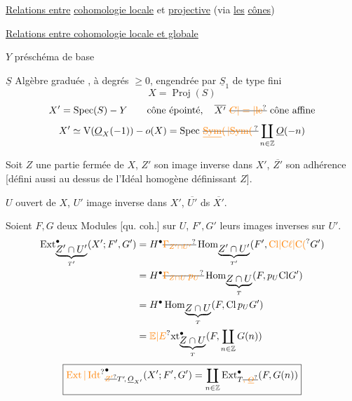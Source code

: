 \uline{Relations entre} \uline{cohomologie locale} et \uline{projective} (via \uline{les} \uline{cônes})

\uline{Relations entre cohomologie locale et globale}

$Y$ préschéma de base

$\underline S$ Algèbre graduée , à degrés $\geq 0$, engendrée par $\underline S_1$ de type fini
\[
 X=\operatorname{Proj}(S)
\]
\[
 X'=\operatorname{Spec}(S)-Y \qquad \text{cône épointé},\quad
 \overline{X'}\ \deleted{\unsure{C|=|\text{le}}}\ \text{cône affine}
\]
\[
 X'\simeq\mathrm V(\underline O_X(-1))-o(X)
 =\operatorname{Spec}\,\deleted{\unsure{\underline{\operatorname{Sym}}(\,|{\operatorname{Sym}}(\,}}%
 \coprod_{n\in\mathbb Z}\underline O(-n)
\]

Soit $Z$ une partie fermée de $X$, $Z'$ son image inverse dans $X'$, $\overline{Z'}$ son adhérence [défini aussi au dessus de l'Idéal homogène définissant $Z$].

$U$ ouvert de $X$, $U'$ image inverse dans $X'$, $\overline{U'}$ ds $\overline{X'}$.

Soient $F,G$ deux Modules [qu. coh.] sur $U$, $F',G'$ leurs images inverses sur $U'$. 
\[
\begin{aligned}
 \operatorname{Ext}^{\bullet}_{\underbrace{Z'\cap U'}_{T'}}(X';F',G')
 &=H^{\bullet}\deleted{\unsure{\Gamma_{Z'\cap U'}}}
 \operatorname{Hom}_{\underbrace{Z'\cap U'}_{T'}}(F',\unsure{\mathrm{Cl}|\mathrm C\ell|\mathrm C(}G')\\
 &=H^{\bullet}\deleted{\unsure{\Gamma_{Z\cap U}\,p_U}}
 \operatorname{Hom}_{\underbrace{Z\cap U}_{T}}(F,p_U\mathrm{Cl}G')\\
 &=H^{\bullet}\operatorname{Hom}_{\underbrace{Z\cap U}_{T}}(F,\mathrm{Cl}\,p_U G')\\
 &=\unsure{\mathbb E|E}\mathrm{xt}^{\bullet}_{\underbrace{Z\cap U}_{T}}
 (F,\coprod_{n\in\mathbb Z}G(n))
\end{aligned}
\]
\[
 \boxed{{\unsure{\operatorname{Ext}|\operatorname{Idt}}}^{\bullet}_{\deleted{\unsure{Z'}}T'\!,\,\underline O_{X'}}(X';F',G')
 =\coprod_{n\in\mathbb Z}\operatorname{Ext}^{\bullet}_{T\deleted{\unsure{,\,\underline O}}}(F,G(n))}
\]

